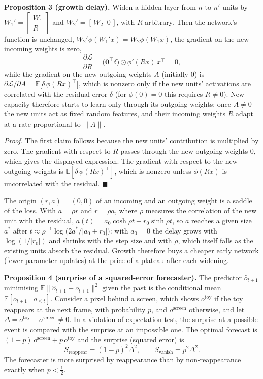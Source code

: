 \documentclass{article}
\begin{document}
\textbf{Proposition 3 (growth delay).} Widen a hidden layer from \(n\) to \(n'\) units by \(W_1'=\begin{bmatrix}W_1\\R\end{bmatrix}\) and \(W_2'=[\,W_2\;\;0\,]\), with \(R\) arbitrary. Then the network's function is unchanged, \(W_2'\phi(W_1'x)=W_2\phi(W_1x)\), the gradient on the new incoming weights is zero,
\begin{equation}\frac{\partial\mathcal L}{\partial R}=\big(\mathbf 0^\top\delta\big)\odot\phi'(Rx)\,x^\top=0,\end{equation}
while the gradient on the new outgoing weights \(A\) (initially \(0\)) is \(\partial\mathcal L/\partial A=\mathbb E\big[\delta\,\phi(Rx)^\top\big]\), which is nonzero only if the new units' activations are correlated with the residual error \(\delta\) (for \(\phi(0)=0\) this requires \(R\neq0\)). New capacity therefore starts to learn only through its outgoing weights: once \(A\neq0\) the new units act as fixed random features, and their incoming weights \(R\) adapt at a rate proportional to \(\lVert A\rVert\).

\emph{Proof.} The first claim follows because the new units' contribution is multiplied by zero. The gradient with respect to \(R\) passes through the new outgoing weights \(0\), which gives the displayed expression. The gradient with respect to the new outgoing weights is \(\mathbb E[\delta\,\phi(Rx)^\top]\), which is nonzero unless \(\phi(Rx)\) is uncorrelated with the residual. \(\blacksquare\)

The origin \((r,a)=(0,0)\) of an incoming and an outgoing weight is a saddle of the loss. With \(\dot a=\rho r\) and \(\dot r=\rho a\), where \(\rho\) measures the correlation of the new unit with the residual, \(a(t)=a_0\cosh\rho t+r_0\sinh\rho t\), so \(a\) reaches a given size \(a^\ast\) after \(t\approx\rho^{-1}\log\big(2a^\ast/\lvert a_0+r_0\rvert\big)\): with \(a_0=0\) the delay grows with \(\log(1/\lvert r_0\rvert)\) and shrinks with the step size and with \(\rho\), which itself falls as the existing units absorb the residual. Growth therefore buys a cheaper early network (fewer parameter-updates) at the price of a plateau after each widening.

\textbf{Proposition 4 (surprise of a squared-error forecaster).} The predictor \(\hat o_{t+1}\) minimising \(\mathbb E\lVert\hat o_{t+1}-o_{t+1}\rVert^2\) given the past is the conditional mean \(\mathbb E[o_{t+1}\mid o_{\le t}]\). Consider a pixel behind a screen, which shows \(o^{\text{toy}}\) if the toy reappears at the next frame, with probability \(p\), and \(o^{\text{screen}}\) otherwise, and let \(\Delta=o^{\text{toy}}-o^{\text{screen}}\neq0\). In a violation-of-expectation test, the surprise at a possible event is compared with the surprise at an impossible one. The optimal forecast is \((1-p)\,o^{\text{screen}}+p\,o^{\text{toy}}\) and the surprise (squared error) is
\begin{equation}S_{\text{reappear}}=(1-p)^2\Delta^2,\qquad S_{\text{vanish}}=p^2\Delta^2 .\end{equation}
The forecaster is more surprised by reappearance than by non-reappearance exactly when \(p<\tfrac12\).
\end{document}
